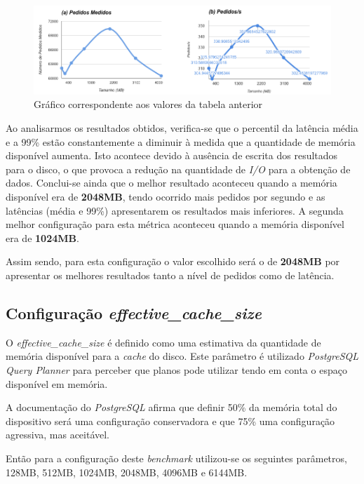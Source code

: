 \begin{figure}[ht!]
\centering
\includegraphics[width=\textwidth]{img/01_sb.png}
\caption{Gráfico correspondente aos valores da tabela anterior\label{overflow}}
\end{figure}

Ao analisarmos os resultados obtidos, verifica-se que o percentil da latência média e a 99\% estão constantemente a diminuir à medida que a quantidade de memória disponível aumenta. Isto acontece devido à ausência de escrita dos resultados para o disco, o que provoca a redução na quantidade de \textit{I/O} para a obtenção de dados. Conclui-se ainda que o melhor resultado aconteceu quando a memória disponível era de \textbf{2048MB}, tendo ocorrido mais pedidos por segundo e as latências (média e 99\%) apresentarem os resultados mais inferiores. A segunda melhor configuração para esta métrica aconteceu quando a memória disponível era de \textbf{1024MB}.

Assim sendo, para esta configuração o valor escolhido será o de \textbf{2048MB} por apresentar os melhores resultados tanto a nível de pedidos como de latência.

\subsection{Configuração \textit{effective\_cache\_size}}

O \textit{effective\_cache\_size} é definido como uma estimativa da quantidade de memória disponível para a \textit{cache} do disco. Este parâmetro é utilizado \textit{PostgreSQL Query Planner} para perceber que planos pode utilizar tendo em conta o espaço disponível em memória.

A documentação do \textit{PostgreSQL} afirma que definir 50\% da memória total do dispositivo será uma configuração conservadora e que 75\% uma configuração agressiva, mas aceitável.

Então para a configuração deste \textit{benchmark} utilizou-se os seguintes parâmetros, 128MB, 512MB, 1024MB, 2048MB, 4096MB e 6144MB.

